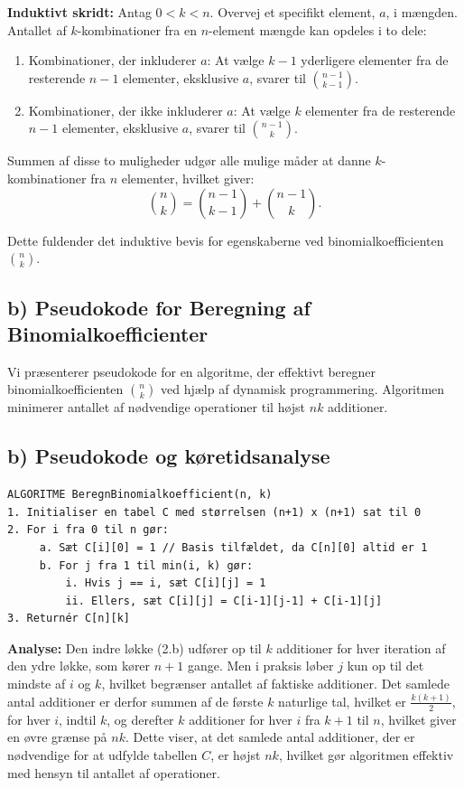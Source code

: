 \documentclass{article}
\begin{document}
\textbf{Induktivt skridt:} Antag \(0 < k < n\). Overvej et specifikt element, \(a\), i mængden. Antallet af \(k\)-kombinationer fra en \(n\)-element mængde kan opdeles i to dele:

\begin{enumerate}
    \item Kombinationer, der inkluderer \(a\): At vælge \(k-1\) yderligere elementer fra de resterende \(n-1\) elementer, eksklusive \(a\), svarer til \(\binom{n-1}{k-1}\).
    \item Kombinationer, der ikke inkluderer \(a\): At vælge \(k\) elementer fra de resterende \(n-1\) elementer, eksklusive \(a\), svarer til \(\binom{n-1}{k}\).
\end{enumerate}

Summen af disse to muligheder udgør alle mulige måder at danne \(k\)-kombinationer fra \(n\) elementer, hvilket giver:
\[
\binom{n}{k} = \binom{n-1}{k-1} + \binom{n-1}{k}.
\]

Dette fuldender det induktive bevis for egenskaberne ved binomialkoefficienten \(\binom{n}{k}\).

\subsection*{b) Pseudokode for Beregning af Binomialkoefficienter}

Vi præsenterer pseudokode for en algoritme, der effektivt beregner binomialkoefficienten \(\binom{n}{k}\) ved hjælp af dynamisk programmering. Algoritmen minimerer antallet af nødvendige operationer til højst \(nk\) additioner.

\subsection*{b) Pseudokode og køretidsanalyse}

\begin{verbatim}
ALGORITME BeregnBinomialkoefficient(n, k)
1. Initialiser en tabel C med størrelsen (n+1) x (n+1) sat til 0
2. For i fra 0 til n gør:
     a. Sæt C[i][0] = 1 // Basis tilfældet, da C[n][0] altid er 1
     b. For j fra 1 til min(i, k) gør:
         i. Hvis j == i, sæt C[i][j] = 1
         ii. Ellers, sæt C[i][j] = C[i-1][j-1] + C[i-1][j]
3. Returnér C[n][k]
\end{verbatim}

\textbf{Analyse:}
Den indre løkke (2.b) udfører op til \(k\) additioner for hver iteration af den ydre løkke, som kører \(n+1\) gange. Men i praksis løber \(j\) kun op til det mindste af \(i\) og \(k\), hvilket begrænser antallet af faktiske additioner. Det samlede antal additioner er derfor summen af de første \(k\) naturlige tal, hvilket er \(\frac{k(k+1)}{2}\), for hver \(i\), indtil \(k\), og derefter \(k\) additioner for hver \(i\) fra \(k+1\) til \(n\), hvilket giver en øvre grænse på \(nk\). Dette viser, at det samlede antal additioner, der er nødvendige for at udfylde tabellen \(C\), er højst \(nk\), hvilket gør algoritmen effektiv med hensyn til antallet af operationer.
\end{document}

